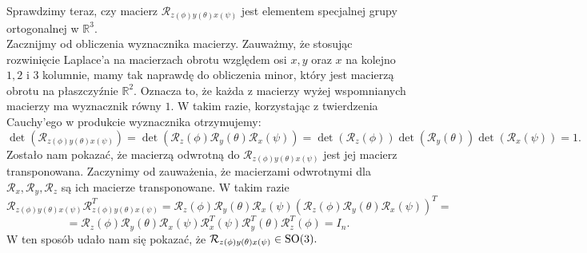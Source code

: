 \documentclass[a4paper,twoside,11pt,reqno]{mwrep}
\theoremstyle{plain} \newtheorem{twr}{Twierdzenie}
\theoremstyle{plain} \newtheorem{lem}{Lemat}
\theoremstyle{definition} \newtheorem{defi}{Definicja}
\theoremstyle{remark} \newtheorem*{wni}{Wniosek}
\theoremstyle{definition} \newtheorem{uwaga}{Uwaga}
\theoremstyle{definition}\newtheorem{prz}{Przykład}
\begin{document}
Sprawdzimy teraz, czy macierz $\mathcal{R}_{z(\phi)y(\theta)x(\psi)}$ jest 
elementem specjalnej grupy ortogonalnej w $\mathbb{R}^3$.\\
Zacznijmy od obliczenia wyznacznika macierzy. Zauważmy, że stosując rozwinięcie Laplace'a
na macierzach obrotu względem osi $x,y$ oraz $x$ na kolejno $1,2$ i $3$ kolumnie, mamy tak naprawdę
do obliczenia minor, który jest macierzą obrotu na płaszczyźnie $\mathbb{R}^2$. Oznacza to, że każda 
z macierzy wyżej wspomnianych macierzy ma wyznacznik równy $1$. 
W takim razie, korzystając z twierdzenia Cauchy'ego w produkcie wyznacznika otrzymujemy: 
$$\det\left(\mathcal{R}_{z(\phi)y(\theta)x(\psi)}\right) = 
\det \left( \mathcal{R}_z(\phi)\mathcal{R}_y(\theta)\mathcal{R}_x(\psi)\right) = 
\det \left( \mathcal{R}_z(\phi)\right)\det\left(\mathcal{R}_y(\theta)\right)
\det\left(\mathcal{R}_x(\psi)\right)=1.$$
Zostało nam pokazać, że macierzą odwrotną do $\mathcal{R}_{z(\phi)y(\theta)x(\psi)}$
jest jej macierz transponowana. Zaczynimy od zauważenia, że macierzami odwrotnymi dla 
$\mathcal{R}_{x},\mathcal{R}_{y},\mathcal{R}_{z}$ są ich macierze transponowane.
W takim razie 
$$\mathcal{R}_{z(\phi)y(\theta)x(\psi)}\mathcal{R}^T_{z(\phi)y(\theta)x(\psi)} = 
\mathcal{R}_z(\phi)\mathcal{R}_y(\theta)\mathcal{R}_x(\psi)
\left(\mathcal{R}_z(\phi)\mathcal{R}_y(\theta)\mathcal{R}_x(\psi)\right)^T=$$
$$=\mathcal{R}_z(\phi)\mathcal{R}_y(\theta)\mathcal{R}_x(\psi)
\mathcal{R}^T_x(\psi)\mathcal{R}^T_y(\theta)\mathcal{R}^T_z(\phi) = I_n.$$
W ten sposób udało nam się pokazać, że  $\mathcal{R}_{z(\phi)y(\theta)x(\psi)} \in \textup{SO}(3).$
\end{document}
